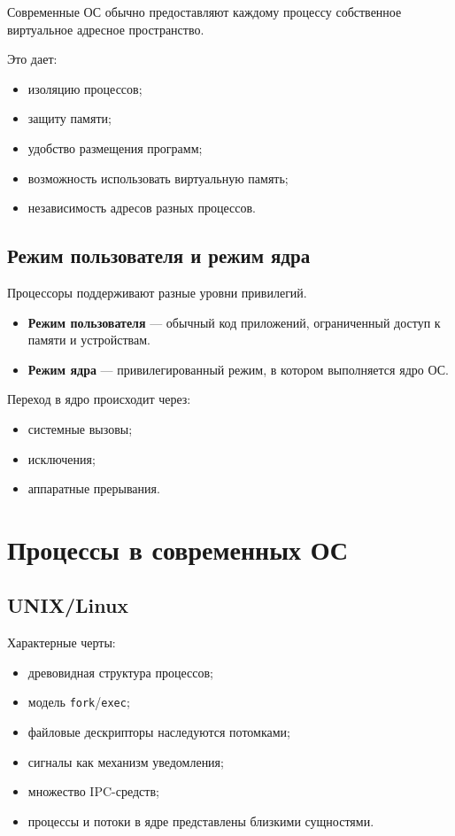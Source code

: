 \documentclass[12pt,a4paper]{article}
\begin{document}
Современные ОС обычно предоставляют каждому процессу собственное виртуальное адресное пространство.

Это дает:
\begin{itemize}
    \item изоляцию процессов;
    \item защиту памяти;
    \item удобство размещения программ;
    \item возможность использовать виртуальную память;
    \item независимость адресов разных процессов.
\end{itemize}

\subsection{Режим пользователя и режим ядра}

Процессоры поддерживают разные уровни привилегий.

\begin{itemize}
    \item \textbf{Режим пользователя} --- обычный код приложений, ограниченный доступ к памяти и устройствам.
    \item \textbf{Режим ядра} --- привилегированный режим, в котором выполняется ядро ОС.
\end{itemize}

Переход в ядро происходит через:
\begin{itemize}
    \item системные вызовы;
    \item исключения;
    \item аппаратные прерывания.
\end{itemize}

\section{Процессы в современных ОС}

\subsection{UNIX/Linux}

Характерные черты:
\begin{itemize}
    \item древовидная структура процессов;
    \item модель \texttt{fork}/\texttt{exec};
    \item файловые дескрипторы наследуются потомками;
    \item сигналы как механизм уведомления;
    \item множество IPC-средств;
    \item процессы и потоки в ядре представлены близкими сущностями.
\end{itemize}
\end{document}
